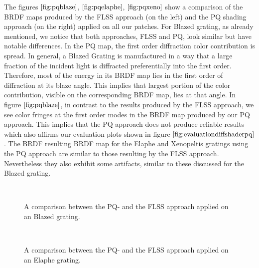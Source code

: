 The figures $\ref{fig:pqblaze}$, $\ref{fig:pqelaphe}$, $\ref{fig:pqxeno}$ show a comparison of the BRDF maps produced by the FLSS approach (on the left) and the PQ shading approach (on the right) applied on all our patches. For Blazed grating, as already mentioned, we notice that both approaches, FLSS and PQ, look similar but have notable differences. In the PQ map, the first order diffraction color contribution is spread. In general, a Blazed Grating is manufactured in a way that a large fraction of the incident light is diffracted preferentially into the first order. Therefore, most of the energy in its BRDF map lies in the first order of diffraction at its blaze angle. This implies that largest portion of the color contribution, visible on the corresponding BRDF map, lies at that angle. In figure $\ref{fig:pqblaze}$, in contrast to the results produced by the FLSS approach, we see color fringes at the first order modes in the BRDF map produced by our PQ approach. This implies that the PQ approach does not produce reliable results which also affirms our evaluation plots shown in figure $\ref{fig:evaluationdiffshaderpq}$. The BRDF resulting BRDF map for the Elaphe and Xenopeltis gratings using the PQ approach are similar to those resulting by the FLSS approach. Nevertheless they also exhibit some artifacts, similar to these discussed for the Blazed grating.

\begin{figure}[H]
  \centering
~
\caption[BRDF Map: PQ vs FLSS Approach on Blazed Grating]{A comparison between the PQ- and the FLSS approach applied on an Blazed grating.}
\label{fig:pqblaze}
\end{figure}

\begin{figure}[H]
  \centering
~

\caption[BRDF Map: PQ vs FLSS Approach on Elaphe Grating]{A comparison between the PQ- and the FLSS approach applied on an Elaphe grating.}
\label{fig:pqelaphe}
\end{figure}

